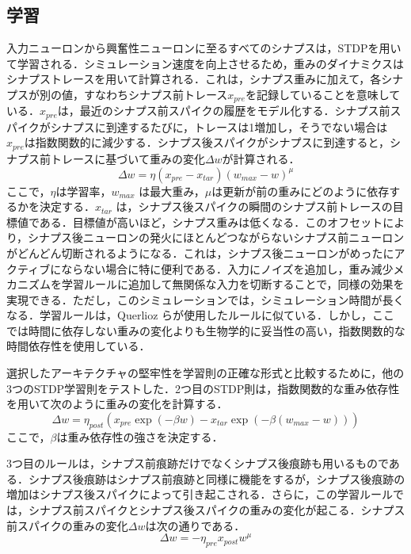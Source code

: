 \documentclass[a4paper, titlepage]{jsarticle}
\begin{document}
\subsection{学習}
入力ニューロンから興奮性ニューロンに至るすべてのシナプスは，STDPを用いて学習される．シミュレーション速度を向上させるため，重みのダイナミクスはシナプストレースを用いて計算される．これは，シナプス重みに加えて，各シナプスが別の値，すなわちシナプス前トレース$x_{pre}$を記録していることを意味している．$x_{pre}$は，最近のシナプス前スパイクの履歴をモデル化する．シナプス前スパイクがシナプスに到達するたびに，トレースは1増加し，そうでない場合は$x_{pre}$は指数関数的に減少する．シナプス後スパイクがシナプスに到達すると，シナプス前トレースに基づいて重みの変化$\Delta w$が計算される．
\begin{equation}
   \Delta w=\eta(x_{pre}-x_{tar})(w_{max}-w)^\mu
\end{equation}
ここで，$\eta$は学習率，$w_{max}$ は最大重み，$\mu$は更新が前の重みにどのように依存するかを決定する．$x_{tar}$ は，シナプス後スパイクの瞬間のシナプス前トレースの目標値である．目標値が高いほど，シナプス重みは低くなる．このオフセットにより，シナプス後ニューロンの発火にほとんどつながらないシナプス前ニューロンがどんどん切断されるようになる．これは，シナプス後ニューロンがめったにアクティブにならない場合に特に便利である．入力にノイズを追加し，重み減少メカニズムを学習ルールに追加して無関係な入力を切断することで，同様の効果を実現できる．ただし，このシミュレーションでは，シミュレーション時間が長くなる．学習ルールは，Querlioz らが使用したルールに似ている．しかし，ここでは時間に依存しない重みの変化よりも生物学的に妥当性の高い，指数関数的な時間依存性を使用している．
\par
選択したアーキテクチャの堅牢性を学習則の正確な形式と比較するために，他の3つのSTDP学習則をテストした．2つ目のSTDP則は，指数関数的な重み依存性を用いて次のように重みの変化を計算する．
\begin{equation}
   \Delta w=\eta_{post}(x_{pre}\exp(-\beta w)-x_{tar}\exp(-\beta(w_{max}-w)))
\end{equation}
ここで，$\beta$は重み依存性の強さを決定する．
\par
3つ目のルールは，シナプス前痕跡だけでなくシナプス後痕跡も用いるものである．シナプス後痕跡はシナプス前痕跡と同様に機能をするが，シナプス後痕跡の増加はシナプス後スパイクによって引き起こされる．さらに，この学習ルールでは，シナプス前スパイクとシナプス後スパイクの重みの変化が起こる．シナプス前スパイクの重みの変化$\Delta w$は次の通りである．
\begin{equation}
   \Delta w=-\eta_{pre}x_{post}w^\mu
\end{equation}
\end{document}
